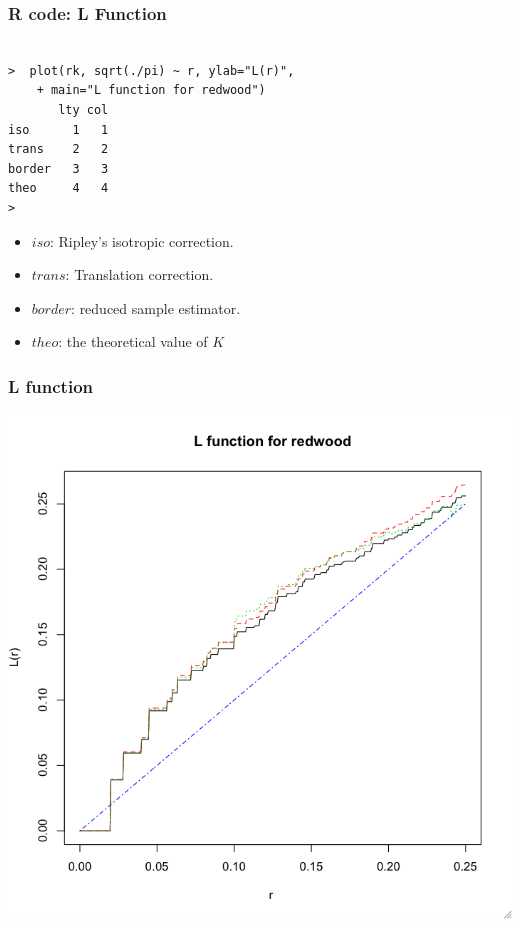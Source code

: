 \documentclass[nototal,handout]{beamer}
\begin{document}
  \begin{frame}[containsverbatim]
    \frametitle{R code: L Function}
    \begin{small}
      \begin{verbatim}

>  plot(rk, sqrt(./pi) ~ r, ylab="L(r)", 
    + main="L function for redwood")
       lty col
iso      1   1
trans    2   2
border   3   3
theo     4   4
> 
      \end{verbatim}
      \begin{itemize}
	\item $iso$: Ripley's isotropic correction.
	\item $trans$: Translation correction.
	\item $border$: reduced sample estimator.
	\item $theo$: the theoretical value of $K$
      \end{itemize}
    \end{small}
   \end{frame}

\begin{frame}[<+->]
    \frametitle{L function}
    \begin{center}
      \includegraphics[width=.65\linewidth]{lredwood.png}
    \end{center}
  \end{frame}
 
\end{document}
